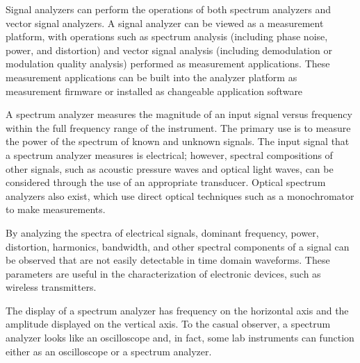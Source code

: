
Signal analyzers can perform the operations of both spectrum analyzers and vector signal analyzers. A signal analyzer can be viewed as a measurement platform, with operations such as spectrum analysis (including phase noise, power, and distortion) and vector signal analysis (including demodulation or modulation quality analysis) performed as measurement applications. These measurement applications can be built into the analyzer platform as measurement firmware or installed as changeable application software

	A spectrum analyzer measures the magnitude of an input signal versus frequency within the full frequency range of the instrument. The primary use is to measure the power of the spectrum of known and unknown signals. The input signal that a spectrum analyzer measures is electrical; however, spectral compositions of other signals, such as acoustic pressure waves and optical light waves, can be considered through the use of an appropriate transducer. Optical spectrum analyzers also exist, which use direct optical techniques such as a monochromator to make measurements.

	By analyzing the spectra of electrical signals, dominant frequency, power, distortion, harmonics, bandwidth, and other spectral components of a signal can be observed that are not easily detectable in time domain waveforms. These parameters are useful in the characterization of electronic devices, such as wireless transmitters.

	The display of a spectrum analyzer has frequency on the horizontal axis and the amplitude displayed on the vertical axis. To the casual observer, a spectrum analyzer looks like an oscilloscope and, in fact, some lab instruments can function either as an oscilloscope or a spectrum analyzer.

